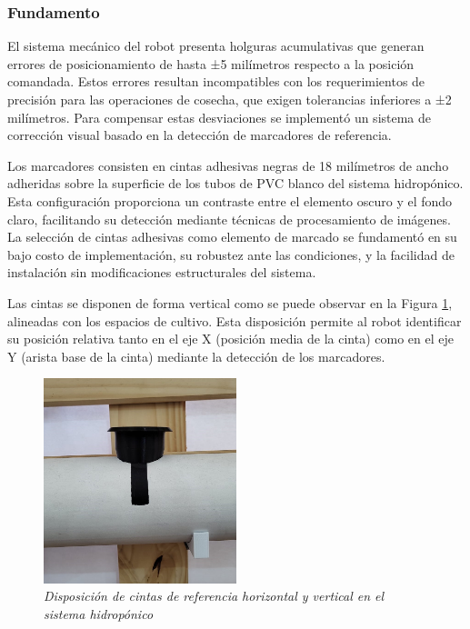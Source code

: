 \subsubsection{Fundamento}

El sistema mecánico del robot presenta holguras acumulativas que generan errores de posicionamiento de hasta ±5 milímetros respecto a la posición comandada. Estos errores resultan incompatibles con los requerimientos de precisión para las operaciones de cosecha, que exigen tolerancias inferiores a ±2 milímetros. Para compensar estas desviaciones se implementó un sistema de corrección visual basado en la detección de marcadores de referencia.

Los marcadores consisten en cintas adhesivas negras de 18 milímetros de ancho adheridas sobre la superficie de los tubos de PVC blanco del sistema hidropónico. Esta configuración proporciona un contraste entre el elemento oscuro y el fondo claro, facilitando su detección mediante técnicas de procesamiento de imágenes. La selección de cintas adhesivas como elemento de marcado se fundamentó en su bajo costo de implementación, su robustez ante las condiciones, y la facilidad de instalación sin modificaciones estructurales del sistema.

Las cintas se disponen de forma vertical como se puede observar en la Figura \ref{fig:configuracion_cintas}, alineadas con los espacios de cultivo. Esta disposición permite al robot identificar su posición relativa tanto en el eje X (posición media de la cinta) como en el eje Y (arista base de la cinta) mediante la detección de los marcadores.

\begin{figure}[h]
\centering
\includegraphics[width=0.50\textwidth]{imagenes/configuracion_cintas_referencia.jpg}
\caption{\textit{Disposición de cintas de referencia horizontal y vertical en el sistema hidropónico}}
\label{fig:configuracion_cintas}
\end{figure}
